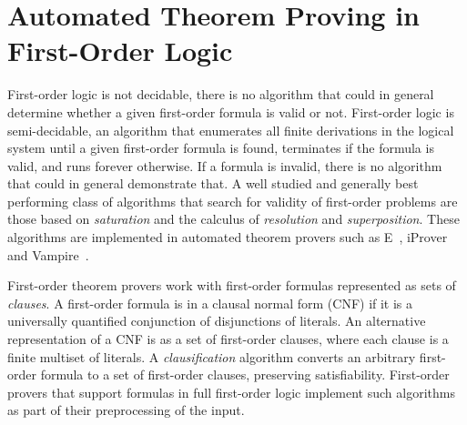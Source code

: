 

\section*{Automated Theorem Proving in First-Order Logic}

First-order logic is not decidable, there is no algorithm that could in general determine whether a given first-order formula is valid or not. First-order logic is semi-decidable, an algorithm that enumerates all finite derivations in the logical system until a given first-order formula is found, terminates if the formula is valid, and runs forever otherwise. If a formula is invalid, there is no algorithm that could in general demonstrate that. A well studied and generally best performing class of algorithms that search for validity of first-order problems are those based on \emph{saturation} and the calculus of \emph{resolution} and \emph{superposition}. These algorithms are implemented in automated theorem provers such as E~\cite{E13}, iProver~\cite{iProver} and Vampire~\cite{Vampire13}.

First-order theorem provers work with first-order formulas represented as sets of \emph{clauses}. A first-order formula is in a clausal normal form (CNF) if it is a universally quantified conjunction of disjunctions of literals. An alternative representation of a CNF is as a set of first-order clauses, where each clause is a finite multiset of literals. A \emph{clausification} algorithm converts an arbitrary first-order formula to a set of first-order clauses, preserving satisfiability. First-order provers that support formulas in full first-order logic implement such algorithms as part of their preprocessing of the input.

